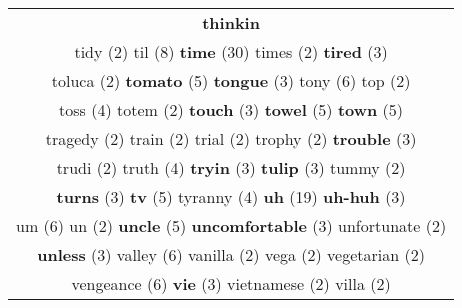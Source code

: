 \documentclass[12pt,a4paper]{article}
\begin{document}
\begin{center}
\begin{longtable}{|c|}
\textcolor{Roxo} {\bf thinkin}} \footnotesize{(5)} {\footnotesize \textcolor{Verde} {thoughts}} \footnotesize{(2)}  \\ {\footnotesize \textcolor{Verde} {tidy}} \footnotesize{(2)} {\huge \textcolor{Amarelo} {til}} \footnotesize{(8)} {\Huge \textcolor{AzulEscuro} {\bf time}} \footnotesize{(30)} {\footnotesize \textcolor{Verde} {times}} \footnotesize{(2)} {\small \textcolor{Laranja} {\bf tired}} \footnotesize{(3)}  \\ {\footnotesize \textcolor{Verde} {toluca}} \footnotesize{(2)} {\large \textcolor{Roxo} {\bf tomato}} \footnotesize{(5)} {\small \textcolor{Laranja} {\bf tongue}} \footnotesize{(3)} {\Large \textcolor{VermEscuro} {tony}} \footnotesize{(6)} {\footnotesize \textcolor{Verde} {top}} \footnotesize{(2)}  \\ {\normalsize \textcolor{VerdeLocao} {toss}} \footnotesize{(4)} {\footnotesize \textcolor{Verde} {totem}} \footnotesize{(2)} {\small \textcolor{Laranja} {\bf touch}} \footnotesize{(3)} {\large \textcolor{Roxo} {\bf towel}} \footnotesize{(5)} {\large \textcolor{Roxo} {\bf town}} \footnotesize{(5)}  \\ {\footnotesize \textcolor{Verde} {tragedy}} \footnotesize{(2)} {\footnotesize \textcolor{Verde} {train}} \footnotesize{(2)} {\footnotesize \textcolor{Verde} {trial}} \footnotesize{(2)} {\footnotesize \textcolor{Verde} {trophy}} \footnotesize{(2)} {\small \textcolor{Laranja} {\bf trouble}} \footnotesize{(3)}  \\ {\footnotesize \textcolor{Verde} {trudi}} \footnotesize{(2)} {\normalsize \textcolor{VerdeLocao} {truth}} \footnotesize{(4)} {\small \textcolor{Laranja} {\bf tryin}} \footnotesize{(3)} {\small \textcolor{Laranja} {\bf tulip}} \footnotesize{(3)} {\footnotesize \textcolor{Verde} {tummy}} \footnotesize{(2)}  \\ {\small \textcolor{Laranja} {\bf turns}} \footnotesize{(3)} {\large \textcolor{Roxo} {\bf tv}} \footnotesize{(5)} {\normalsize \textcolor{VerdeLocao} {tyranny}} \footnotesize{(4)} {\Huge \textcolor{AzulEscuro} {\bf uh}} \footnotesize{(19)} {\small \textcolor{Laranja} {\bf uh-huh}} \footnotesize{(3)}  \\ {\Large \textcolor{VermEscuro} {um}} \footnotesize{(6)} {\footnotesize \textcolor{Verde} {un}} \footnotesize{(2)} {\large \textcolor{Roxo} {\bf uncle}} \footnotesize{(5)} {\small \textcolor{Laranja} {\bf uncomfortable}} \footnotesize{(3)} {\footnotesize \textcolor{Verde} {unfortunate}} \footnotesize{(2)}  \\ {\small \textcolor{Laranja} {\bf unless}} \footnotesize{(3)} {\Large \textcolor{VermEscuro} {valley}} \footnotesize{(6)} {\footnotesize \textcolor{Verde} {vanilla}} \footnotesize{(2)} {\footnotesize \textcolor{Verde} {vega}} \footnotesize{(2)} {\footnotesize \textcolor{Verde} {vegetarian}} \footnotesize{(2)}  \\ {\Large \textcolor{VermEscuro} {vengeance}} \footnotesize{(6)} {\small \textcolor{Laranja} {\bf vie}} \footnotesize{(3)} {\footnotesize \textcolor{Verde} {vietnamese}} \footnotesize{(2)} {\footnotesize \textcolor{Verde} {villa}} \footnotesize{(2)} {\normalsize \textcolor{VerdeLocao} 
\end{longtable}
\end{center}
\end{document}
